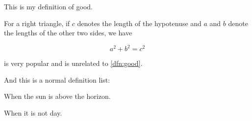 \begin{dfn}\label{dfn:good} 

This is my definition of good.

\end{dfn}

\begin{thm}\label{thm:pythagorean} 

For a right triangle, if \(c\) denotes the length of the hypotenuse and
\(a\) and \(b\) denote the lengths of the other two sides, we have

\end{thm}

\[a^2 + b^2 = c^2\]

 is very popular and is unrelated to
\cref{dfn:good}.

And this is a normal definition list:

\begin{description}
\tightlist
\item[Day]
When the sun is above the horizon.
\item[Night]
When it is not day.
\end{description}
